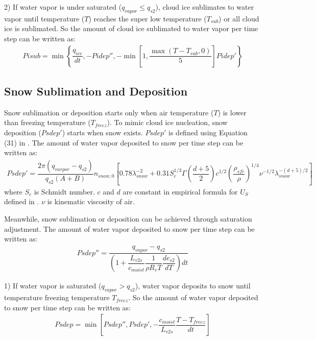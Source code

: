 \documentclass[letterpaper,titlepage,10pt]{article}
\numberwithin{equation}{section}
\begin{document}
2) If water vapor is under saturated ($q_{vapor} \leq q_{s2}$), cloud ice sublimates to water vapor until temperature ($T$) reaches the super low temperature ($T_{sub}$) or all cloud ice is sublimated. So the amount of cloud ice sublimated to water vapor per time step can be written as:
\begin{gather} \label{eq:pi2v}
	Pisub = \min \left\{\dfrac{q_{ice}}{dt}, - Pidep'', - \min \left[1, \dfrac{\max \left(T - T_{sub}, 0 \right)}{5} \right] Pidep' \right\}
\end{gather}


\subsection{Snow Sublimation and Deposition}

Snow sublimation or deposition starts only when air temperature ($T$) is lower than freezing temperature ($T_{freez}$). To mimic cloud ice nucleation, snow deposition ($Psdep'$) starts when snow exists. $Psdep'$ is defined using Equation (31) in \citet{lin1983bulk}. The amount of water vapor deposited to snow per time step can be written as:
\begin{gather}
	Psdep' = \dfrac{2 \pi \left(q_{varpor} - q_{s2} \right)}{q_{s2} \left(A + B \right)} n_{snow,0} \left[0.78 \lambda^{-2}_{snow} + 0.31 S^{1/3}_c \Gamma \left(\dfrac{d + 5}{2} \right) c^{1/2} \left(\dfrac{\rho_{sfc}}{\rho} \right)^{1/4} \nu^{-1/2} \lambda^{- (d + 5) / 2}_{snow} \right]
\end{gather}
where $S_c$ is Schmidt number. $c$ and $d$ are constant in empirical formula for $U_S$ defined in \citet{lin1983bulk}. $\nu$ is kinematic viscosity of air.

Meanwhile, snow sublimation or deposition can be achieved through saturation adjustment. The amount of water vapor deposited to snow per time step can be written as:
\begin{gather}
	Psdep'' = \dfrac{q_{vapor} - q_{s2}}{\left(1 + \dfrac{L_{v2s}}{c_{moist}} \dfrac{1}{\rho R_v T} \dfrac{de_{s2}}{dT} \right) dt}
\end{gather}

1) If water vapor is saturated ($q_{vapor} > q_{s2}$), water vapor deposits to snow until temperature freezing temperature $T_{freez}$. So the amount of water vapor deposited to snow per time step can be written as:
\begin{gather}
	Psdep = \min \left[Psdep'', Psdep', - \dfrac{c_{moist}}{L_{v2s}} \dfrac{T - T_{freez}}{dt} \right]
\end{gather}
\end{document}
